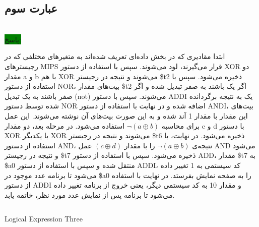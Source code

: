 \subsection{عبارت سوم}
\\
\colorbox{green}{پاسخ:}
\normalfont

{ ابتدا مقادیری که در بخش داده‌ای تعریف شده‌اند به متغیرهای مختلفی که در رجیسترهای MIPS قرار می‌گیرند، لود می‌شوند. سپس با استفاده از دستور XOR دو مقدار a و b با هم XOR می‌شوند و نتیجه در رجیستر \$t2 ذخیره می‌شود. سپس با استفاده از دستور NOR، بیت‌های مقدار \$t2 اگر یک باشند به صفر تبدیل شده و اگر صفر باشند به یک تبدیل (not) می‌شوند. سپس با دستور ADDI یک به نتیجه برگردانده شده توسط دستور NOR اضافه شده و در نهایت با استفاده از دستور ANDI، بیت‌های این مقدار با مقدار 1 آند شده و به این صورت بیت‌های آن نوشته می‌شوند. این عمل برای محاسبه $\lnot(a \oplus b)$ استفاده می‌شود. در مرحله بعد، دو مقدار c و d با دستور XOR با یکدیگر XOR می‌شوند و نتیجه در رجیستر \$t6 ذخیره می‌شود. در نهایت، با استفاده از دستور AND، نتیجه‌ی $\lnot(a \oplus b)$ را با مقدار $(c \oplus d)$ عمل AND می‌شود و نتیجه در رجیستر \$t7 ذخیره می‌شود. سپس با استفاده از دستور ADD، مقدار \$t7 به \$a0 منتقل شده و سپس با استفاده از دستور ADDI، کد سیستمی به 1 تغییر داده می‌شود تا برنامه عدد موجود در \$a0 را به صفحه نمایش بفرستد. در نهایت با استفاده از دستور ADDI و مقدار 10 به کد سیستمی دیگر، یعنی خروج از برنامه تغییر داده می‌شود تا برنامه پس از نمایش عدد مورد نظر، خاتمه یابد.}
\begin{latin}
\begin{listing}[H]
    \inputminted[linenos=true]{asm}{sources/Logical_Expression_Three.mips}
    \caption{Logical Expression Three}
    \label{Logical-Expression-Three}
\end{listing}
\end{latin}